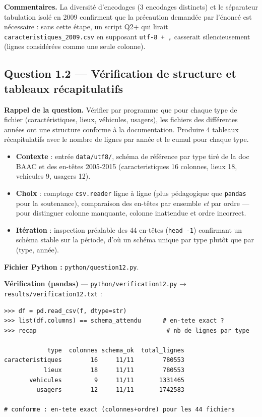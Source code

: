 \documentclass[11pt,a4paper]{article}
\newcommand{\rub}[2]{\textbf{\textcolor{#1}{#2}}}
\begin{document}
\rub{labcomment}{Commentaires.} La diversité d'encodages (3 encodages distincts) et le séparateur tabulation isolé en 2009 confirment que la précaution demandée par l'énoncé est nécessaire : sans cette étape, un script Q2+ qui lirait \texttt{caracteristiques\_2009.csv} en supposant \texttt{utf-8 + ,} casserait silencieusement (lignes considérées comme une seule colonne).

\clearpage
\subsection*{Question 1.2 — Vérification de structure et tableaux récapitulatifs}

\rub{labrappel}{Rappel de la question.} Vérifier par programme que pour chaque type de fichier (caractéristiques, lieux, véhicules, usagers), les fichiers des différentes années ont une structure conforme à la documentation. Produire 4 tableaux récapitulatifs avec le nombre de lignes par année et le cumul pour chaque type.

\begin{agentbox}
\begin{itemize}
\item \textbf{Contexte} : entrée \texttt{data/utf8/}, schéma de référence par type tiré de la doc BAAC et des en-têtes 2005-2015 (caracteristiques 16 colonnes, lieux 18, vehicules 9, usagers 12).
\item \textbf{Choix} : comptage \texttt{csv.reader} ligne à ligne (plus pédagogique que \texttt{pandas} pour la soutenance), comparaison des en-têtes par ensemble \emph{et} par ordre — pour distinguer colonne manquante, colonne inattendue et ordre incorrect.
\item \textbf{Itération} : inspection préalable des 44 en-têtes (\texttt{head -1}) confirmant un schéma stable sur la période, d'où un schéma unique par type plutôt que par (type, année).
\end{itemize}
\end{agentbox}

\rub{labfichier}{Fichier Python :} \texttt{python/question12.py}.

\rub{labverif}{Vérification (pandas)} --- \texttt{python/verification12.py} → \texttt{results/verification12.txt} :

\begin{lstlisting}[style=pyblock]
>>> df = pd.read_csv(f, dtype=str)
>>> list(df.columns) == schema_attendu      # en-tete exact ?
>>> recap                                    # nb de lignes par type

            type  colonnes schema_ok  total_lignes
caracteristiques        16     11/11        780553
           lieux        18     11/11        780553
       vehicules         9     11/11       1331465
         usagers        12     11/11       1742583

# conforme : en-tete exact (colonnes+ordre) pour les 44 fichiers
\end{lstlisting}
\end{document}
